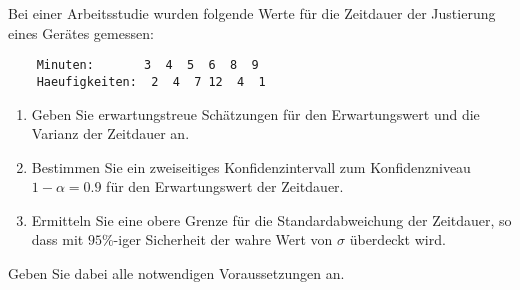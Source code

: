  Bei einer Arbeitsstudie wurden folgende
Werte für die Zeitdauer der Justierung eines Gerätes gemessen:
\begin{lstlisting}
    Minuten:       3  4  5  6  8  9
    Haeufigkeiten:  2  4  7 12  4  1
\end{lstlisting}
\begin{enumerate}
    \item Geben Sie erwartungstreue Schätzungen für den Erwartungswert und die
        Varianz der Zeitdauer an.

    \item Bestimmen Sie ein zweiseitiges Konfidenzintervall zum Konfidenzniveau
        $1-\alpha=0.9$ für den Erwartungswert der Zeitdauer. 
    \item Ermitteln Sie eine obere Grenze für die Standardabweichung der Zeitdauer,
        so dass mit $95\%$-iger Sicherheit der wahre Wert von $\sigma$ überdeckt
        wird.
\end{enumerate}
Geben Sie dabei alle notwendigen Voraussetzungen an.

